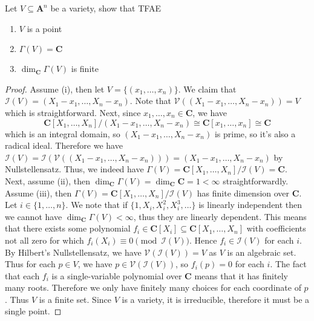 \documentclass[11pt]{book}
\begin{document}
\begin{problem}
Let $V\subseteq\mathbf A^n$ be a variety, show that TFAE
\begin{enumerate}[label=(\roman*)]
	\item $V$ is a point
	\item $\Gamma(V)=\mathbf C$
	\item $\dim_{\mathbf C}\Gamma(V)$ is finite
\end{enumerate}
\begin{proof}
Assume (i), then let $V=\{(x_1,\dots,x_n)\}$. We claim that $\mathcal{I}(V)=(X_1-x_1,\dots,X_n-x_n)$. Note that $\mathcal{V}((X_1-x_1,\dots,X_n-x_n))=V$ which is straightforward. Next, since $x_1,\dots,x_n\in \mathbf C$, we have
\[\mathbf C[X_1,\dots,X_n]/(X_1-x_1,\dots,X_n-x_n)\cong \mathbf C[x_1,\dots,x_n]\cong\mathbf C\]
which is an integral domain, so $(X_1-x_1,\dots,X_n-x_n)$ is prime, so it's also a radical ideal. Therefore we have $\mathcal{I}(V)=\mathcal{I}(\mathcal{V}((X_1-x_1,\dots,X_n-x_n)))=(X_1-x_1,\dots,X_n-x_n)$ by Nullstellensatz. Thus, we indeed have $\Gamma(V)=\mathbf C[X_1,\dots,X_n]/\mathcal{I}(V)=\mathbf C$. Next, assume (ii), then $\dim_{\mathbf C} \Gamma(V)=\dim_{\mathbf C}\mathbf C=1<\infty$ straightforwardly. Assume (iii), then $\Gamma(V)=\mathbf C[X_1,\dots,X_n]/\mathcal{I}(V)$ has finite dimension over $\mathbf C$. Let $i\in\{1,\dots,n\}$. We note that if $\{1,X_i,X_i^2,X_i^3,\dots\}$ is linearly independent then we cannot have $\dim_{\mathbf C}\Gamma(V)<\infty$, thus they are linearly dependent. This means that there exists some polynomial $f_i\in\mathbf C[X_i]\subseteq \mathbf C[X_1,\dots,X_n]$ with coefficients not all zero for which $f_i(X_i)\equiv 0 \pmod{\mathcal{I}(V)}$. Hence $f_i\in\mathcal{I}(V)$ for each $i$. By Hilbert's Nullstellensatz, we have $\mathcal{V}(\mathcal{I}(V))=V$ as $V$ is an algebraic set. Thus for each $p\in V$, we have $p\in\mathcal{V}(\mathcal{I}(V))$, so $f_i(p)=0$ for each $i$. The fact that each $f_i$ is a single-variable polynomial over $\mathbf C$ means that it has finitely many roots. Therefore we only have finitely many choices for each coordinate of $p$. Thus $V$ is a finite set. Since $V$ is a variety, it is irreducible, therefore it must be a single point. 
\end{proof}
\end{problem}
\end{document}
